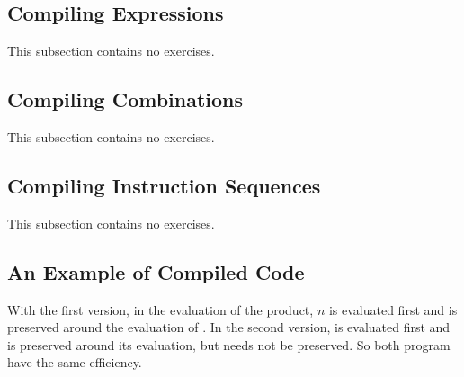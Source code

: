 \subsection{Compiling Expressions}

This subsection contains no exercises.

\subsection{Compiling Combinations}

This subsection contains no exercises.

\subsection{Compiling Instruction Sequences}

This subsection contains no exercises.

\subsection{An Example of Compiled Code}

\begin{exe}[5.33]
    With the first version, in the evaluation of the product, $n$ is evaluated 
    first and  is preserved around the evaluation of
    . In the second version,
     is evaluated first and  is preserved 
    around its evaluation, but  needs not be preserved. So both 
    program have the same efficiency.
\end{exe}

